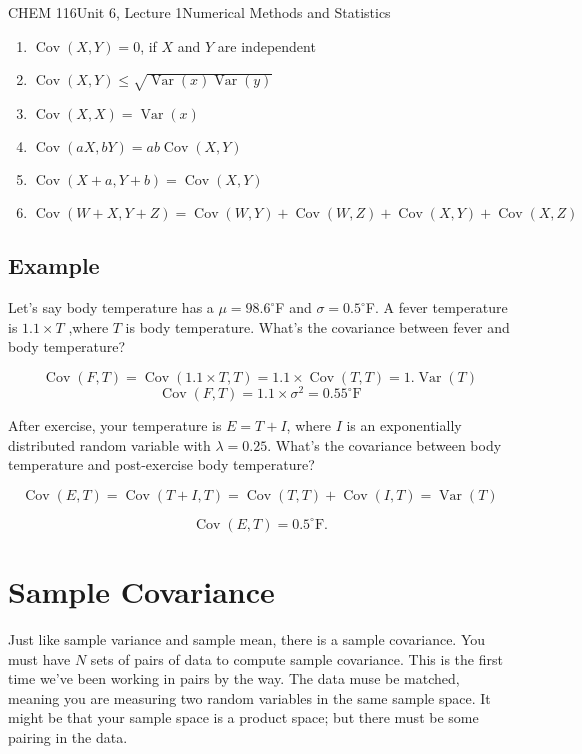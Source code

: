 \documentclass{article}
\DeclareMathOperator{\Var}{Var}
\DeclareMathOperator{\Cov}{Cov}
\begin{document}
\begin{tdoc}{CHEM 116}{Unit 6, Lecture 1}{Numerical Methods and Statistics}
\begin{enumerate}

\item $\Cov(X,Y) = 0$, if $X$ and $Y$ are independent\\

\item $\Cov(X,Y) \leq \sqrt{\Var(x)\Var(y)}$\\

\item $\Cov(X,X) = \Var(x)$\\

\item $\Cov(aX, bY) = ab\Cov(X,Y)$\\

\item $\Cov(X + a, Y + b) = \Cov(X,Y)$\\

\item $\Cov(W + X, Y + Z ) = \Cov(W, Y) + \Cov(W, Z) + \Cov(X, Y) + \Cov(X, Z)$\\

\end{enumerate}

\subsection{Example}

Let's say body temperature has a $\mu = 98.6 ^{\circ}$F and $\sigma=
0.5 ^{\circ}$F. A fever temperature is $1.1\times T$ ,where $T$ is
body temperature. What's the covariance between fever and body temperature?

\[
\Cov(F, T) = \Cov(1.1\times T, T) = 1.1\times \Cov(T, T) = 1. \Var(T)
\]
\[
\Cov(F,T) = 1.1\times \sigma^2 = 0.55^\circ \textrm{F}
\]

After exercise, your temperature is $E = T + I$, where $I$ is an
exponentially distributed random variable with $\lambda =0.25$. What's the covariance between body temperature and
post-exercise body temperature?

\[
\Cov(E, T) = \Cov(T + I, T) = \Cov(T, T) + \Cov(I, T) = \Var(T)
\]

\[
\Cov(E, T) = 0.5^\circ \textrm{F}.
\]

\section{Sample Covariance}

Just like sample variance and sample mean, there is a sample
covariance. You must have $N$ sets of pairs of data to compute sample
covariance. This is the first time we've been working in pairs by the
way. The data muse be matched, meaning you are measuring two random
variables in the same sample space. It might be that your sample space
is a product space; but there must be some pairing in the data.


\end{tdoc}
\end{document}
